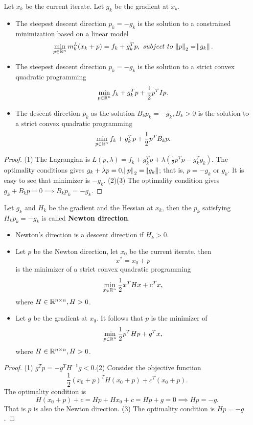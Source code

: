 \begin{refsection}
\begin{lemma}\hfill
Let $x_k$ be the current iterate. Let $g_k$ be the gradient at $x_k$.
\begin{itemize}
	\item The steepest descent direction $p_k = -g_k$ is the solution to a constrained minimization based on a linear model 
	$$\min_{p\in \mathbb{R}^n} m_k^L(x_k + p) = f_k + g_k^T p, ~subject~to~ \norm{p}_2 = \norm{g_k}.$$
	\item The steepest descent direction $p_k = -g_k$ is the solution to a strict convex quadratic programming
	$$\min_{p\in \mathbb{R}^n} f_k + g_k^T p + \frac{1}{2}p^TIp.$$
	\item The descent direction $p_k$ as the solution $B_kp_k = -g_k, B_k > 0$ is the solution to a strict convex quadratic programming
	$$\min_{p\in \mathbb{R}^n} f_k + g_k^T p + \frac{1}{2}p^TB_kp.$$
\end{itemize}
\end{lemma}
\begin{proof}
(1) The Lagrangian is $L(p,\lambda) = f_k + g_k^T p + \lambda(\frac{1}{2}p^Tp - g_k^Tg_k)$. The optimality conditions gives
$g_k + \lambda p = 0, \norm{p}_2 = \norm{g_k} $; that is, $p = -g_k$ or $g_k$. It is easy to see that minimizer is $-g_k$. 
(2)(3) The optimality condition gives $g_k + B_kp = 0 \implies B_kp_k = -g_k$.
\end{proof}


\begin{definition}
Let $g_k$ and $H_k$ be the gradient and the Hessian at $x_k$, then the $p_k$ satisfying $H_k p_k = -g_k$ is called \textbf{Newton direction}.
\end{definition}



\begin{lemma}\hfill
\begin{itemize}
	\item Newton's direction is a descent direction if $H_k > 0$.
	\item Let $p$ be the Newton direction, let $x_0$ be the current iterate, then 
	$$x^* = x_0 + p$$
	is the minimizer of a strict convex quadratic programming
	$$\min_{x\in\mathbb{R}^n} \frac{1}{2}x^THx + c^Tx,$$
	where $H\in\mathbb{R}^{n\times n}, H > 0$.
	\item Let $g$ be the gradient at $x_0$. It follows that $p$ is the minimizer of 
	  	$$\min_{p\in\mathbb{R}^n} \frac{1}{2}p^THp + g^Tx,$$
	  where $H\in\mathbb{R}^{n\times n}, H > 0$.
\end{itemize}
\end{lemma}
\begin{proof}
(1) $g^Tp = -g^TH^{-1}g < 0$.(2) Consider the objective function 
$$\frac{1}{2}(x_0 + p)^TH(x_0 + p) + c^T(x_0+p).$$
The optimality condition is $$H(x_0 + p) + c = Hp + Hx_0 + c = Hp + g = 0 \implies Hp = -g.$$
That is $p$ is also the Newton direction.
(3) The optimality condition is $Hp = -g$.
\end{proof}


\end{refsection}
